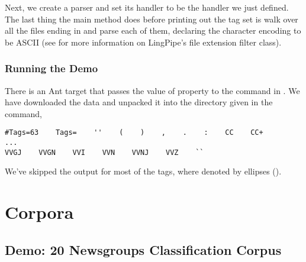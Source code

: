 Next, we create a parser and set its handler to be the
handler we just defined.
%
%
The last thing the main method does before printing out the tag set is
walk over all the files ending in  and parse each of them,
declaring the character encoding to be ASCII (see
 for more information on LingPipe's
file extension filter class).

\subsubsection{Running the Demo}

There is an Ant target  that passes
the value of property  to the command
in .  We have downloaded the data
and unpacked it into the directory given in the command,
%
\begin{verbatim}
#Tags=63    Tags=    ''    (    )    ,    .    :    CC    CC+
... 
VVGJ    VVGN    VVI    VVN    VVNJ    VVZ    ``
\end{verbatim}
%
We've skipped the output for most of the tags, where denoted by
ellipses ().

\section{Corpora}

\subsection{Demo: 20 Newsgroups Classification Corpus}\label{section:20-news-corpus}

